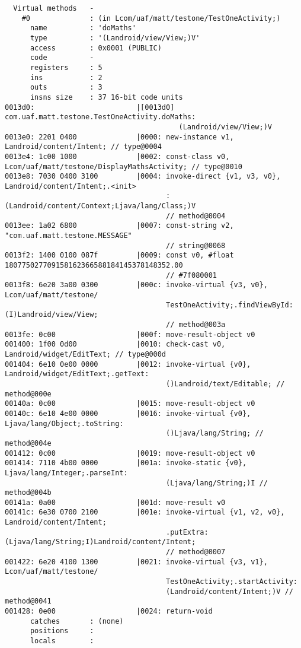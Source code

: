 \begin{lstlisting}
  Virtual methods   -
    #0              : (in Lcom/uaf/matt/testone/TestOneActivity;)
      name          : 'doMaths'
      type          : '(Landroid/view/View;)V'
      access        : 0x0001 (PUBLIC)
      code          -
      registers     : 5
      ins           : 2
      outs          : 3
      insns size    : 37 16-bit code units
0013d0:                        |[0013d0] com.uaf.matt.testone.TestOneActivity.doMaths:
                                         (Landroid/view/View;)V
0013e0: 2201 0400              |0000: new-instance v1, Landroid/content/Intent; // type@0004
0013e4: 1c00 1000              |0002: const-class v0, Lcom/uaf/matt/testone/DisplayMathsActivity; // type@0010
0013e8: 7030 0400 3100         |0004: invoke-direct {v1, v3, v0}, Landroid/content/Intent;.<init>
                                      :(Landroid/content/Context;Ljava/lang/Class;)V
                                      // method@0004
0013ee: 1a02 6800              |0007: const-string v2, "com.uaf.matt.testone.MESSAGE"
                                      // string@0068
0013f2: 1400 0100 087f         |0009: const v0, #float 180775027709158162366588184145378148352.00
                                      // #7f080001
0013f8: 6e20 3a00 0300         |000c: invoke-virtual {v3, v0}, Lcom/uaf/matt/testone/
                                      TestOneActivity;.findViewById:(I)Landroid/view/View;
                                      // method@003a
0013fe: 0c00                   |000f: move-result-object v0
001400: 1f00 0d00              |0010: check-cast v0, Landroid/widget/EditText; // type@000d
001404: 6e10 0e00 0000         |0012: invoke-virtual {v0}, Landroid/widget/EditText;.getText:
                                      ()Landroid/text/Editable; // method@000e
00140a: 0c00                   |0015: move-result-object v0
00140c: 6e10 4e00 0000         |0016: invoke-virtual {v0}, Ljava/lang/Object;.toString:
                                      ()Ljava/lang/String; // method@004e
001412: 0c00                   |0019: move-result-object v0
001414: 7110 4b00 0000         |001a: invoke-static {v0}, Ljava/lang/Integer;.parseInt:
                                      (Ljava/lang/String;)I // method@004b
00141a: 0a00                   |001d: move-result v0
00141c: 6e30 0700 2100         |001e: invoke-virtual {v1, v2, v0}, Landroid/content/Intent;
                                      .putExtra:(Ljava/lang/String;I)Landroid/content/Intent;
                                      // method@0007
001422: 6e20 4100 1300         |0021: invoke-virtual {v3, v1}, Lcom/uaf/matt/testone/
                                      TestOneActivity;.startActivity:
                                      (Landroid/content/Intent;)V // method@0041
001428: 0e00                   |0024: return-void
      catches       : (none)
      positions     :
      locals        :


\end{lstlisting}
